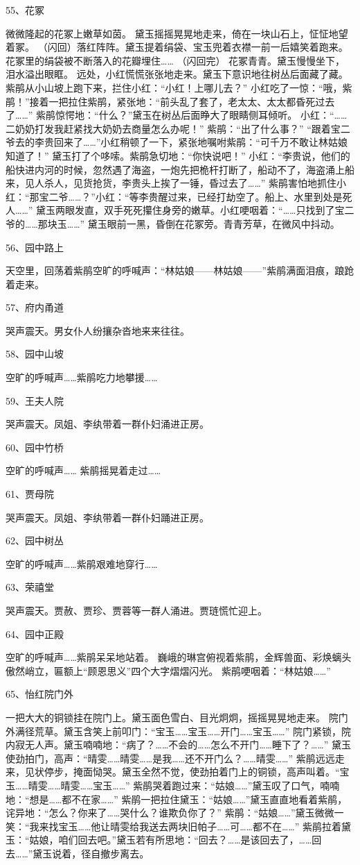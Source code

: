 55、花冢\par
微微隆起的花冢上嫩草如茵。
黛玉摇摇晃晃地走来，倚在一块山石上，怔怔地望着冢。 
（闪回）落红阵阵。黛玉提着绢袋、宝玉兜着衣襟一前一后嬉笑着跑来。 
花冢里的绢袋被不断落入的花瓣埋住…… （闪回完） 
花冢青青。黛玉慢慢坐下，泪水溢出眼眶。 
远处，小红慌慌张张地走来。黛玉下意识地往树丛后面藏了藏。 
紫鹃从小山坡上跑下来，拦住小红：“小红！上哪儿去？” 
小红吃了一惊：“哦，紫鹃！”接着一把拉住紫鹃，紧张地：“前头乱了套了，老太太、太太都昏死过去了……” 
紫鹃惊愕地：“什么？”黛玉在树丛后面睁大了眼睛侧耳倾听。 
小红：“……二奶奶打发我赶紧找大奶奶去商量怎么办呢！” 紫鹃：“出了什么事？” 
“跟着宝二爷去的李贵回来了……”小红稍顿了一下，紧张地嘱咐紫鹃：“可千万不敢让林姑娘知道了！” 
黛玉打了个哆嗦。紫鹃急切地：“你快说吧！” 
小红：“李贵说，他们的船快进内河的时候，忽然遇了海盗，一炮先把桅杆打断了，船动不了，海盗涌上船来，见人杀人，见货抢货，李贵头上挨了一锤，昏过去了……” 
紫鹃害怕地抓住小红：“那宝二爷……？”小红：“等李贵醒过来，已经打劫空了。船上、水里到处是死人……” 
黛玉两眼发直，双手死死攥住身旁的嫩草。小红哽咽着：“……只找到了宝二爷的……那块玉……” 
黛玉眼前一黑，昏倒在花冢旁。青青芳草，在微风中抖动。 

56、园中路上\par 
天空里，回荡着紫鹃空旷的呼喊声：“林姑娘——林姑娘——”紫鹃满面泪痕，踉跄着走来。 

57、府内甬道\par
哭声震天。男女仆人纷攘杂沓地来来往往。 

58、园中山坡\par
空旷的呼喊声……紫鹃吃力地攀援…… 

59、王夫人院\par
哭声震天。凤姐、李纨带着一群仆妇涌进正房。 

60、园中竹桥\par
空旷的呼喊声…… 紫鹃摇晃着走过…… 

61、贾母院\par 
哭声震天。凤姐、李纨带着一群仆妇踊进正房。 

62、园中树丛\par
空旷的呼喊声……紫鹃艰难地穿行…… 

63、荣禧堂\par 
哭声震天。贾赦、贾珍、贾蓉等一群人涌进。贾琏慌忙迎上。 

64、园中正殿\par
空旷的呼喊声……紫鹃呆呆地站着。 
巍峨的琳宫俯视着紫鹃，金辉兽面、彩焕螭头傲然峭立，匾额上“顾恩思义”四个大字熠熠闪光。 紫鹃哽咽着：“林姑娘……” 

65、怡红院门外\par 
一把大大的铜锁挂在院门上。黛玉面色雪白、目光炯炯，摇摇晃晃地走来。 
院门外满径荒草。黛玉含笑上前叩门：“宝玉……宝玉……开门……宝玉……” 
院门紧锁，院内寂无人声。黛玉喃喃地：“病了？……不会的……怎么不开门……睡下了？……” 
黛玉使劲拍门，高声：“晴雯……晴雯……是我……还不开门么？……晴雯……” 
紫鹃远远走来，见状停步，掩面恸哭。黛玉全然不觉，使劲拍着门上的铜锁，高声叫着。“宝玉……晴雯……晴雯……宝玉……” 
紫鹃哭着跑过来：“姑娘……”黛玉叹了口气，喃喃地：“想是……都不在家……” 
紫鹃一把拉住黛玉：“姑娘……”黛玉直直地看着紫鹃，诧异地：“怎么？你来了……哭什么？谁欺负你了？” 
紫鹃：“姑娘……”黛玉微微一笑：“我来找宝玉……他让晴雯给我送去两块旧帕子……可……都不在……” 
紫鹃拉着黛玉：“姑娘，咱们回去吧。”黛玉若有所思地：“回去？……是该回去了，……回去……”黛玉说着，径自撤步离去。 

